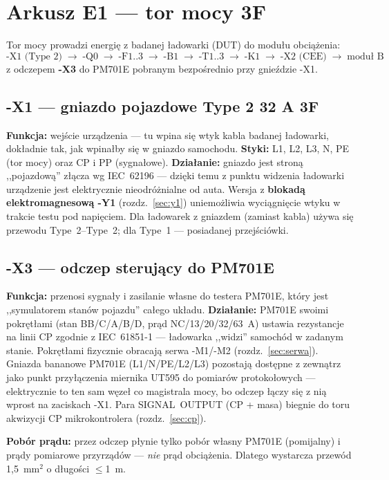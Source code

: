 \documentclass[11pt,a4paper]{article}
\begin{document}
\section{Arkusz E1 --- tor mocy 3F}
\label{sec:e1}

Tor mocy prowadzi energię z badanej ładowarki (DUT) do modułu obciążenia:
\[
\text{-X1 (Type 2)} \;\to\; \text{-Q0} \;\to\; \text{-F1..3} \;\to\; \text{-B1} \;\to\;
\text{-T1..3} \;\to\; \text{-K1} \;\to\; \text{-X2 (CEE)} \;\to\; \text{moduł B}
\]
z odczepem \textbf{-X3} do PM701E pobranym bezpośrednio przy gnieździe -X1.

\subsection{-X1 --- gniazdo pojazdowe Type 2 32 A 3F}
\textbf{Funkcja:} wejście urządzenia --- tu wpina się wtyk kabla badanej ładowarki, dokładnie tak,
jak wpinałby się w gniazdo samochodu. \textbf{Styki:} L1, L2, L3, N, PE (tor mocy) oraz CP i PP
(sygnałowe). \textbf{Działanie:} gniazdo jest stroną ,,pojazdową'' złącza wg IEC~62196 --- dzięki
temu z punktu widzenia ładowarki urządzenie jest elektrycznie nieodróżnialne od auta. Wersja
z \textbf{blokadą elektromagnesową -Y1} (rozdz.~\ref{sec:y1}) uniemożliwia wyciągnięcie wtyku
w trakcie testu pod napięciem. Dla ładowarek z gniazdem (zamiast kabla) używa się przewodu
Type~2--Type~2; dla Type~1 --- posiadanej przejściówki.

\subsection{-X3 --- odczep sterujący do PM701E}
\label{sec:x3}
\textbf{Funkcja:} przenosi sygnały i zasilanie własne do testera PM701E, który jest ,,symulatorem
stanów pojazdu'' całego układu. \textbf{Działanie:} PM701E swoimi pokrętłami (stan BB/C/A/B/D,
prąd NC/13/20/32/63~A) ustawia rezystancje na linii CP zgodnie z IEC~61851-1 --- ładowarka
,,widzi'' samochód w zadanym stanie. Pokrętłami fizycznie obracają serwa -M1/-M2 (rozdz.~\ref{sec:serwa}).
Gniazda bananowe PM701E (L1/N/PE/L2/L3) pozostają dostępne z zewnątrz jako punkt przyłączenia
miernika UT595 do pomiarów protokołowych --- elektrycznie to ten sam węzeł co magistrala mocy,
bo odczep łączy się z nią wprost na zaciskach -X1. Para SIGNAL~OUTPUT (CP + masa) biegnie do toru
akwizycji CP mikrokontrolera (rozdz.~\ref{sec:cp}).

\textbf{Pobór prądu:} przez odczep płynie tylko pobór własny PM701E (pomijalny) i prądy pomiarowe
przyrządów --- \emph{nie} prąd obciążenia. Dlatego wystarcza przewód 1,5~mm$^2$ o długości
$\le$1~m.
\end{document}
